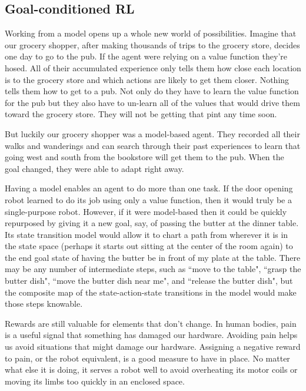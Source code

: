 \subsection{Goal-conditioned RL}
\label{subsec:introgoal}

Working from a model opens up a whole new world of possibilities.
Imagine that our grocery shopper, after making thousands of trips to
the grocery store, decides one day to go to the pub. If the agent were
relying on a value function they're hosed. All of their accumulated
experience only tells them how close each location is to the grocery store
and which actions are likely to get them closer. Nothing tells them
how to get to a pub. Not only do they have to learn the value function
for the pub but they also have to un-learn all of the values that
would drive them toward the grocery store. They will not be getting
that pint any time soon.

But luckily our grocery shopper was a model-based agent.
They recorded all their walks and wanderings and can search through
their past experiences to learn that going west and south from the
bookstore will get them to the pub. When the goal changed,
they were able to adapt right away.

Having a model enables an agent to do more than one task. If the door
opening robot learned to do its job using only a value function,
then it would truly be a single-purpose robot. However, if it were
model-based then it could be quickly repurposed by giving it a new goal,
say, of passing the butter at the dinner table. Its state transition
model would allow it to chart a path from wherever it is in the
state space (perhaps it starts out sitting at the center of the room again)
to the end goal state of having the butter be in front of my plate
at the table. There may be any number of intermediate steps,
such as ``move to the table", ``grasp the butter dish",
``move the butter dish near me", and ``release the butter dish",
but the composite map of the state-action-state transitions
in the model would make those steps knowable.

Rewards are still valuable for elements that don't change.
In human bodies, pain is a useful signal that something has damaged our
hardware. Avoiding pain helps us avoid situations that might damage
our hardware. Assigning a negative reward to pain, or the robot 
equivalent, is a good measure to have in place. No matter what else
it is doing, it serves a robot well to avoid overheating its motor coils
or moving its limbs too quickly in an enclosed space.

